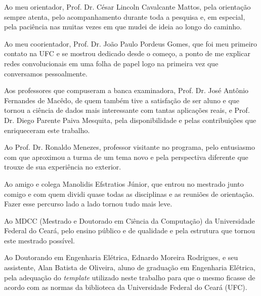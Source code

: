 Ao meu orientador, Prof. Dr. César Lincoln Cavalcante Mattos, pela orientação sempre atenta, pelo acompanhamento durante toda a pesquisa e, em especial, pela paciência nas muitas vezes em que mudei de ideia ao longo do caminho.

Ao meu coorientador, Prof. Dr. João Paulo Pordeus Gomes, que foi meu primeiro contato na UFC e se mostrou dedicado desde o começo, a ponto de me explicar redes convolucionais em uma folha de papel logo na primeira vez que conversamos pessoalmente.

Aos professores que compuseram a banca examinadora, Prof. Dr. José Antônio Fernandes de Macêdo, de quem também tive a satisfação de ser aluno e que tornou a ciência de dados mais interessante com tantas aplicações reais, e Prof. Dr. Diego Parente Paiva Mesquita, pela disponibilidade e pelas contribuições que enriqueceram este trabalho.

Ao Prof. Dr. Ronaldo Menezes, professor visitante no programa, pelo entusiasmo com que aproximou a turma de um tema novo e pela perspectiva diferente que trouxe de sua experiência no exterior.

Ao amigo e colega Manolidis Efstratios Júnior, que entrou no mestrado junto comigo e com quem dividi quase todas as disciplinas e as reuniões de orientação. Fazer esse percurso lado a lado tornou tudo mais leve.

Ao MDCC (Mestrado e Doutorado em Ciência da Computação) da Universidade Federal do Ceará, pelo ensino público e de qualidade e pela estrutura que tornou este mestrado possível.

Ao Doutorando em Engenharia Elétrica, Ednardo Moreira Rodrigues, e seu assistente, Alan Batista de Oliveira, aluno de graduação em Engenharia Elétrica, pela adequação do \textit{template} utilizado neste trabalho para que o mesmo ficasse de acordo com as normas da biblioteca da Universidade Federal do Ceará (UFC). %
